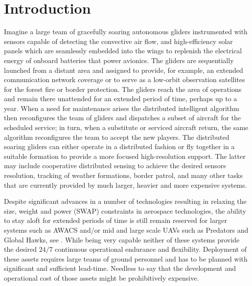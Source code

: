 \documentclass{ifacconf}
\begin{document}
\section{Introduction}
Imagine a large team of gracefully soaring autonomous gliders instrumented with sensors capable of detecting the convective air flow, and high-efficiency solar panels which are seamlessly embedded into the wings to replenish the electrical energy of onboard batteries that power avionics. The gliders are sequentially launched from a distant area and assigned to provide, for example, an extended communication network coverage or to serve as a low-orbit observation satellites for the forest fire or border protection. The gliders reach the area of operations and remain there unattended for an extended period of time, perhaps up to a year. When a need for maintenance arises the distributed intelligent algorithm then reconfigures the team of gliders and dispatches a subset of aircraft for the scheduled service; in turn, when a substitute or serviced aircraft return, the same algorithm reconfigures the team to accept the new players. The distributed soaring gliders can either operate in a distributed fashion or fly together in a suitable formation to provide a more focused high-resolution support. The latter may include cooperative distributed sensing to achieve the desired sensors resolution, tracking of weather formations, border patrol, and many other tasks that are currently provided by much larger, heavier and more expensive systems.

Despite significant advances in a number of technologies resulting in relaxing the size, weight and power (SWAP) constraints in aerospace technologies, the ability to stay aloft for extended periods of time is still remain reserved for larger systems such as AWACS and/or mid and large scale UAVs such as Predators and Global Hawks, see \cite{Best:2005}. While being very capable neither of these systems provide the desired $24/7$ continuous operational endurance and flexibility. Deployment of these assets requires large teams of ground personnel and has to be planned with significant and sufficient lead-time. Needless to say that the development and operational cost of those assets might be prohibitively expensive.
\end{document}
